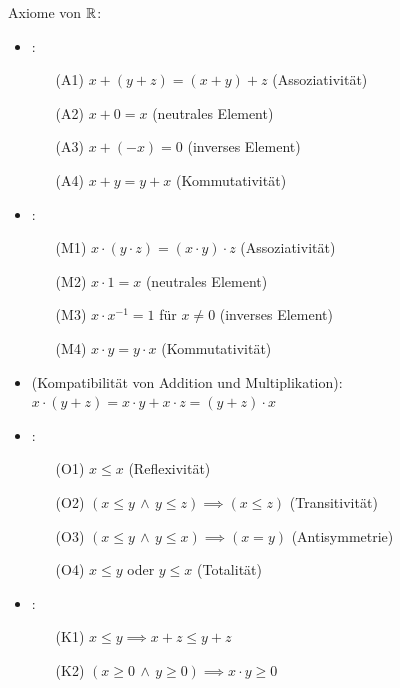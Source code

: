 \Def Axiome von $\mathbb{R}$:
\vspace{-0.6em}
\begin{itemize}
    \item {}:
    \begin{itemize}
        \item[(A1)] $x + (y + z) = (x + y) + z$ (Assoziativität)
        \item[(A2)] $x + 0 = x$ (neutrales Element)
        \item[(A3)] $x + (-x) = 0$ (inverses Element)
        \item[(A4)] $x + y = y + x$ (Kommutativität) 
    \end{itemize}

    \item {}:
    \begin{itemize}
        \item[(M1)] $x \cdot (y \cdot z) = (x \cdot y) \cdot z$ (Assoziativität)
        \item[(M2)] $x \cdot 1 = x$ (neutrales Element)
        \item[(M3)] $x \cdot x^{-1} = 1$ für $x \ne 0$ (inverses Element)
        \item[(M4)] $x \cdot y = y \cdot x$ (Kommutativität)
    \end{itemize}
    
    \item {} (Kompatibilität von Addition und Multiplikation):
        $x \cdot (y + z) = x \cdot y + x \cdot z = (y + z) \cdot x$
    
    \item {}:
    \begin{itemize}
        \item[(O1)] $x\le x$ (Reflexivität)
        \item[(O2)] $(x\le y \, \land \, y\le z) \implies (x\le z)$ (Transitivität)
        \item[(O3)] $(x\le y \, \land \, y\le x) \implies (x = y)$ (Antisymmetrie)
        \item[(O4)] $x\le y$ oder $y\le x$ (Totalität)
    \end{itemize}

    \item {}:
    \begin{itemize}
        \item[(K1)] $x\le y \implies x + z\le y + z$
        \item[(K2)] $(x\ge 0 \, \land \, y\ge 0) \implies x \cdot y\ge 0$
    \end{itemize}
\end{itemize}

